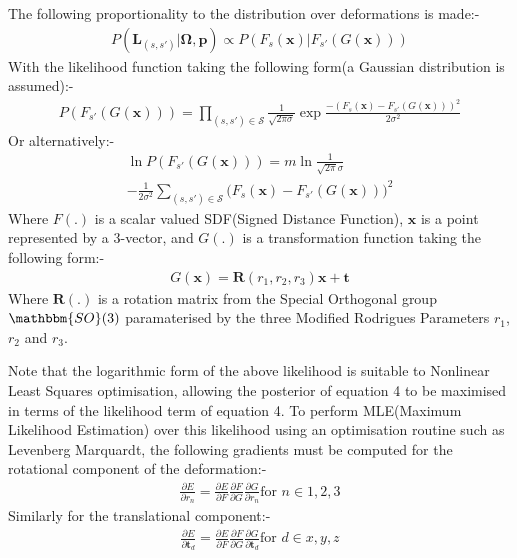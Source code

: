 The following proportionality to the distribution over deformations is made:-
\begin{equation}
\begin{split}
P(\mathbf{L}_{(s, s')} | \mathbf{\Omega}, \mathbf{p}) \propto P(F_{s}(\mathbf{x}) | F_{s'}(G(\mathbf{x})))
\end{split}
\end{equation}
With the likelihood function taking the following form(a Gaussian distribution is assumed):-
\begin{equation}
\begin{split}
P(F_{s'}(G(\mathbf{x}))) = \prod_{(s, s') \in \mathcal{S}} \frac{1}{\sqrt{2 \pi \sigma}} \exp{\frac{-(F_{s}(\mathbf{x}) - F_{s'}(G(\mathbf{x})))^2}{2\sigma^2}}
\end{split}
\end{equation}
Or alternatively:-
\begin{equation}
\begin{split}
\ln P(F_{s'}(G(\mathbf{x}))) = m\ln\frac{1}{\sqrt{2\pi}\sigma}\\
-\frac{1}{2\sigma^2} \sum_{(s, s') \in \mathcal{S}} \bigg( F_{s}(\mathbf{x}) - F_{s'}(G(\mathbf{x})) \bigg)^2
\end{split}
\end{equation}
Where $F(.)$ is a scalar valued SDF(Signed Distance Function), $\mathbf{x}$ is a point represented by a 3-vector, and $G(.)$ is a transformation function taking
the following form:-
\begin{equation}
\begin{split}
G(\mathbf{x}) = \mathbf{R}(r_{1}, r_{2}, r_{3})\mathbf{x} + \mathbf{t}
\end{split}
\end{equation}
Where $\mathbf{R}(.)$ is a rotation matrix from the Special Orthogonal group $\mathbbm{SO}(3)$ paramaterised by the three Modified 
Rodrigues Parameters\cite{Shuster1993} $r_{1}$, $r_{2}$ and $r_{3}$.

Note that the logarithmic form of the above likelihood is suitable to Nonlinear Least Squares optimisation, allowing the posterior of equation 4 
to be maximised in terms of the likelihood term of equation 4. To perform MLE(Maximum Likelihood Estimation) over this likelihood using 
an optimisation routine such as Levenberg Marquardt, the following gradients must be computed for the rotational component of the 
deformation:-
\begin{equation}
\begin{split}
\frac{\partial E}{\partial r_{n}} = \frac{\partial E}{\partial F} \frac{\partial F}{\partial G} \frac{\partial G}{\partial r_{n}} \text{for } n \in {1,2,3}
\end{split}
\end{equation}
Similarly for the translational component:-
\begin{equation}
\begin{split}
\frac{\partial E}{\partial \mathbf{t}_{d}} = \frac{\partial E}{\partial F} \frac{\partial F}{\partial G} \frac{\partial G}{\partial \mathbf{t}_{d}} \text{for } d \in {x,y,z}
\end{split}
\end{equation}

